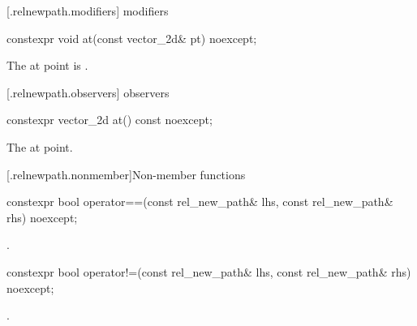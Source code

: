  [\iotwod.relnewpath.modifiers]{ modifiers}%

%
\begin{itemdecl}
constexpr void at(const vector_2d& pt) noexcept;
\end{itemdecl}
\begin{itemdescr}
\pnum
\effects
The at point is .
\end{itemdescr}

 [\iotwod.relnewpath.observers]{ observers}%

%
\begin{itemdecl}
constexpr vector_2d at() const noexcept;
\end{itemdecl}
\begin{itemdescr}
\pnum
\returns
The at point.
\end{itemdescr}

 [\iotwod.relnewpath.nonmember]{Non-member functions}%

%
\begin{itemdecl}
constexpr bool operator==(const rel_new_path& lhs, const rel_new_path& rhs) 
  noexcept;
\end{itemdecl}
\begin{itemdescr}
\pnum
\returns
{}.
\end{itemdescr}

%
\begin{itemdecl}
constexpr bool operator!=(const rel_new_path& lhs, const rel_new_path& rhs) 
  noexcept;
\end{itemdecl}
\begin{itemdescr}
\pnum
\returns
{}.
\end{itemdescr}

